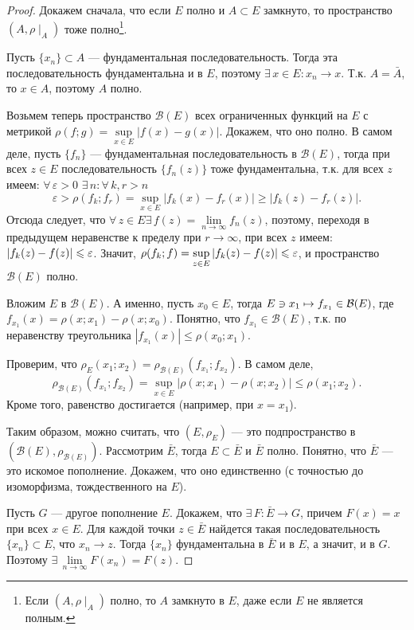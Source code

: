 \documentclass[10pt,titlepage, a4paper]{article}
\begin{document}
\begin{proof}
Докажем сначала, что если $E$ полно и $A\subset E$ замкнуто, то
пространство $(A,\rho\mid_A)$ тоже полно\footnote{Если
$(A,\rho\mid_A)$ полно, то $A$ замкнуто в $E$, даже если $E$ не
является полным.}.

Пусть $\{x_n\}\subset A$ --- фундаментальная последовательность.
Тогда эта последовательность фундаментальна и в $E$, поэтому
$\exists\, x\in E:x_n\to x$. Т.к. $A=\bar{A}$, то $x\in A$, поэтому
$A$ полно.

Возьмем теперь пространство $\mathcal{B}(E)$ всех ограниченных
функций на $E$ с метрикой $\rho(f;g)=\sup\limits_{x\in
E}|f(x)-g(x)|$. Докажем, что оно полно. В самом деле, пусть
$\{f_n\}$ --- фундаментальная последовательность в $\mathcal{B}(E)$,
тогда при всех $z\in E$ последовательность $\{f_n(z)\}$ тоже
фундаментальна, т.к. для всех $z$ имеем: $\forall\,\varepsilon>0$\;
$\exists\,n:\forall\,k,r>n$
$$\varepsilon>\rho(f_k;f_r)=\sup\limits_{x\in
E}|f_k(x)-f_r(x)|\geqslant|f_k(z)-f_r(z)|.$$ Отсюда следует, что
$\forall\,z\in E$\;\;$\exists\,f(z)=\lim\limits_{n\to\infty}f_n(z)$,
поэтому, переходя в предыдущем неравенстве к пределу при
$r\to\infty$, при всех $z$ имеем:
$|f_k(z)\p-f(z)|\leqslant\varepsilon$. Значит,
$\rho(f_k;f)\p=\sup\limits_{z\in
E}|f_k(z)-f(z)|\leqslant\varepsilon$, и пространство
$\mathcal{B}(E)$ полно.

Вложим $E$ в $\mathcal{B}(E)$. А именно, пусть $x_0\in E$, тогда
$E\ni x_1\mapsto f_{x_1}\p\in\mathcal{B}(E)$, где
$f_{x_1}(x)=\rho(x;x_1)-\rho(x;x_0)$. Понятно, что
$f_{x_1}\in\mathcal{B}(E)$, т.к. по неравенству треугольника
$|f_{x_1}(x)|\leqslant\rho(x_0;x_1)$.

Проверим, что
$\rho_E(x_1;x_2)=\rho_{\mathcal{B}(E)}(f_{x_1};f_{x_2})$. В самом
деле, $$\rho_{\mathcal{B}(E)}(f_{x_1};f_{x_2})=\sup\limits_{x\in
E}|\rho(x;x_1)-\rho(x;x_2)|\leqslant\rho(x_1;x_2).$$ Кроме того,
равенство достигается (например, при $x=x_1$).

Таким образом, можно считать, что $(E,\rho_E)$ --- это
подпространство в $(\mathcal{B}(E), \rho_{\mathcal{B}(E)})$.
Рассмотрим $\bar{E}$, тогда $E\subset \bar{E}$ и $\bar{E}$ полно.
Понятно, что $\bar{E}$
--- это искомое пополнение. Докажем, что оно единственно (с точностью
до изоморфизма, тождественного на $E$).

Пусть $G$ --- другое пополнение $E$. Докажем, что $\exists\, F\colon
\bar{E}\to G$, причем $F(x)=x$ при всех $x\in E$. Для каждой точки
$z\in\bar{E}$ найдется такая последовательность $\{x_n\}\subset E$,
что $x_n\to z$. Тогда $\{x_n\}$ фундаментальна в $\bar{E}$ и в $E$,
а значит, и в $G$. Поэтому
$\exists\,\lim\limits_{n\to\infty}F(x_n)=F(z)$.


\end{proof}
\end{document}
